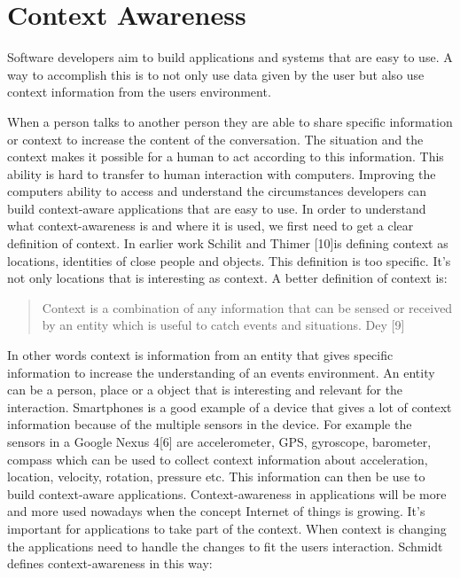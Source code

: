 \section{Context Awareness}
Software developers aim to build applications and systems that are easy to use. A way to accomplish this is to not only use data given by the user but also use context information from the users environment.

When a person talks to another person they are able to share specific information or context to increase the content of the conversation. The situation and the context makes it possible for a human to act according to this information. 
This ability is hard to transfer to human interaction with computers. Improving the computers ability to access and understand the circumstances developers can build context-aware applications that are easy to use. In order to understand what context-awareness is and where it is used, we first need to get a clear definition of context.
In earlier work Schilit and Thimer [10]is defining context as locations, identities of close people and objects. This definition is too specific. It's not only locations that is interesting as context. A better definition of context is:

\begin{quotation}
Context is a combination of any information that can be sensed or received by an entity which is useful to catch events and situations. Dey [9]
\end{quotation}

In other words context is information from an entity that gives specific information to increase the understanding of an events environment. An entity can be a person, place or a object that is interesting and relevant for the interaction. Smartphones is a good example of a device that gives a lot of context information because of the multiple sensors in the device. For example the sensors in a Google Nexus 4[6] are accelerometer, GPS, gyroscope, barometer, compass which can be used to collect context information about acceleration, location, velocity, rotation, pressure etc. This information can then be use to build context-aware applications. Context-awareness in applications will be more and more used nowadays when the concept Internet of things is growing. It's important for applications to take part of the context. When context is changing the applications need to handle the changes to fit the users interaction. Schmidt defines context-awareness in this way:

